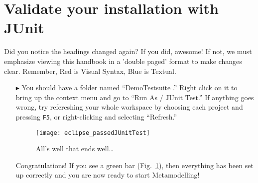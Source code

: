 \newpage
\genHeader

\section{Validate your installation with JUnit}

Did you notice the headings changed again? If you did, awesome! If not, we must emphasize viewing this handbook in a 'double paged' format to make changes clear. Remember, Red is Visual Syntax, Blue is Textual.


\begin{itemize}

\item[$\blacktriangleright$] You should have a folder named ``DemoTestsuite .'' Right click on it to bring up the context menu and go to ``Run As / JUnit Test.'' If anything goes wrong, try refereshing your whole workspace by choosing each project and pressing  \texttt{F5}, or right-clicking and selecting ``Refresh.''

\vspace{0.5cm}

\begin{figure}[htbp]
	\centering
  \texttt{[image: eclipse\_passedJUnitTest]}
	\caption{All's well that ends well\ldots}
	\label{fig_passedTest}
\end{figure}

\vspace{0.5cm}

Congratulations!  If you see a green bar  (Fig.~\ref{fig_passedTest}), then everything has been set up correctly and you are now ready to start Metamodelling!

\end{itemize}

\newpage
\mbox{}